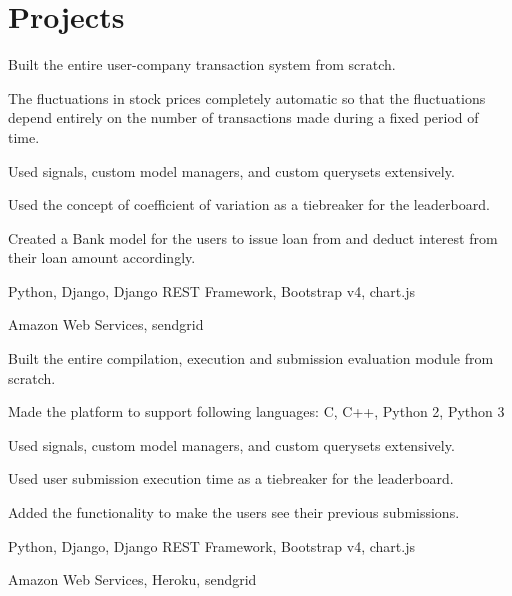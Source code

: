 
\section{Projects}

\begin{tightemize}
\item Built the entire user-company transaction system from scratch.
\item The fluctuations in stock prices completely automatic so that the fluctuations depend entirely on the number of transactions made during a fixed period of time.
\item Used signals, custom model managers, and custom querysets extensively.
\item Used the concept of coefficient of variation as a tiebreaker for the leaderboard.
\item Created a Bank model for the users to issue loan from and deduct interest from their loan amount accordingly.
\item {} Python, Django, Django REST Framework, Bootstrap v4, chart.js
\item {} Amazon Web Services, sendgrid
\end{tightemize}
\sectionsep

\begin{tightemize}
\item Built the entire compilation, execution and submission evaluation module from scratch.
\item Made the platform to support following languages: C, C++, Python 2, Python 3
\item Used signals, custom model managers, and custom querysets extensively.
\item Used user submission execution time as a tiebreaker for the leaderboard.
\item Added the functionality to make the users see their previous submissions.
\item {} Python, Django, Django REST Framework, Bootstrap v4, chart.js
\item {} Amazon Web Services, Heroku, sendgrid
\end{tightemize}
\sectionsep

